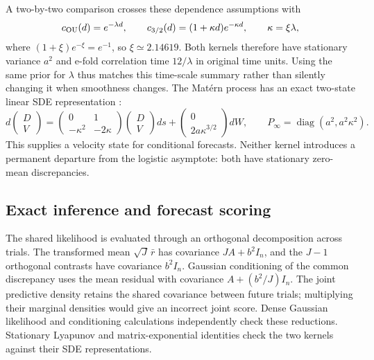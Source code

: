     A two-by-two comparison crosses these dependence assumptions with
    \[
        c_{\rm OU}(d)=e^{-\lambda d},\qquad
        c_{3/2}(d)=(1+\kappa d)e^{-\kappa d},\qquad
        \kappa=\xi\lambda,
    \]
    where \((1+\xi)e^{-\xi}=e^{-1}\), so \(\xi\simeq2.14619\).
    Both kernels therefore have stationary variance \(a^2\) and e-fold
    correlation time \(12/\lambda\) in original time units. Using the same
    prior for \(\lambda\) thus matches this time-scale summary rather than
    silently changing it when smoothness changes. The Mat\'ern process has
    an exact two-state linear SDE representation
    \citep[Example 12.7]{sarkka2019applied}:
    \[
        d\begin{pmatrix}D\\V\end{pmatrix}
        =\begin{pmatrix}0&1\\-\kappa^2&-2\kappa\end{pmatrix}
         \begin{pmatrix}D\\V\end{pmatrix}ds
        +\begin{pmatrix}0\\2a\kappa^{3/2}\end{pmatrix}dW,
        \qquad
        P_\infty=\operatorname{diag}(a^2,a^2\kappa^2).
    \]
    This supplies a velocity state for conditional forecasts. Neither kernel
    introduces a permanent departure from the logistic asymptote: both have
    stationary zero-mean discrepancies.

\subsection{Exact inference and forecast scoring}

    The shared likelihood is evaluated through an orthogonal decomposition
    across trials. The transformed mean \(\sqrt J\,\bar r\) has covariance
    \(JA+b^2I_n\), and the \(J-1\) orthogonal contrasts have covariance
    \(b^2I_n\). Gaussian conditioning of the common discrepancy uses the
    mean residual with covariance \(A+(b^2/J)I_n\). The joint predictive
    density retains the shared covariance between future trials; multiplying
    their marginal densities would give an incorrect joint score. Dense
    Gaussian likelihood and conditioning calculations independently check
    these reductions. Stationary Lyapunov and matrix-exponential identities
    check the two kernels against their SDE representations.

